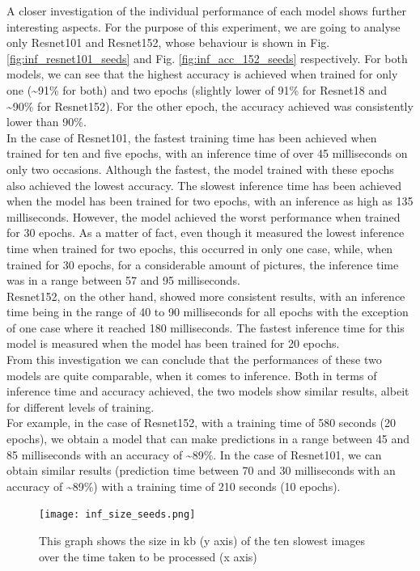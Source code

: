 A closer investigation of the individual performance of each model shows further interesting aspects. For the purpose of this experiment, we are going to analyse only Resnet101 and Resnet152, whose behaviour is shown in Fig. \ref{fig:inf_resnet101_seeds} and Fig. \ref{fig:inf_acc_152_seeds} respectively. For both models, we can see that the highest accuracy is achieved when trained for only one (\textasciitilde91\% for both) and two epochs (slightly lower of 91\% for Resnet18 and \textasciitilde90\% for Resnet152). For the other epoch, the accuracy achieved was consistently lower than 90\%. \\
In the case of Resnet101, the fastest training time has been achieved when trained for ten and five epochs, with an inference time of over 45 milliseconds on only two occasions. Although the fastest, the model trained with these epochs also achieved the lowest accuracy. The slowest inference time has been achieved when the model has been trained for two epochs, with an inference as high as 135 milliseconds. However, the model achieved the worst performance when trained for 30 epochs. As a matter of fact, even though it measured the lowest inference time when trained for two epochs, this occurred in only one case, while, when trained for 30 epochs, for a considerable amount of pictures, the inference time was in a range between 57 and 95 milliseconds. \\
Resnet152, on the other hand, showed more consistent results, with an inference time being in the range of 40 to 90 milliseconds for all epochs with the exception of one case where it reached 180 milliseconds. The fastest inference time for this model is measured when the model has been trained for 20 epochs.\\
From this investigation we can conclude that the performances of these two models are quite comparable, when it comes to inference. Both in terms of inference time and accuracy achieved, the two models show similar results, albeit for different levels of training. \\
For example, in the case of Resnet152, with a training time of 580 seconds (20 epochs), we obtain a model that can make predictions in a range between 45 and 85 milliseconds with an accuracy of \textasciitilde89\%. In the case of Resnet101, we can obtain similar results (prediction time between 70 and 30 milliseconds with an accuracy of \textasciitilde89\%) with a training time of 210 seconds (10 epochs). \\

\begin{figure}[h]
       \centering 
	    \texttt{[image: inf\_size\_seeds.png]}
        \caption[Size of the images over inference time for the seedlings dataset]{This graph shows the size in kb (y axis) of the ten slowest images over the time taken to be processed (x axis)}
         \label{fig:inf_size_seeds}
\end{figure}



